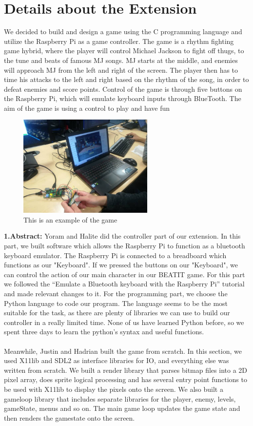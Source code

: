 \documentclass[a4paper]{article}
\begin{document}
\section{Details about the Extension}
We decided to build and design a game using the C programming language and utilize the Raspberry Pi as a game controller. The game is a rhythm fighting game hybrid, where the player will control Michael Jackson to fight off thugs, to the tune and beats of famous MJ songs. MJ starts at the middle, and enemies will approach MJ from the left and right of the screen. The player then has to time his attacks to the left and right based on the rhythm of the song, in order to defeat enemies and score points. Control of the game is through five buttons on the Raspberry Pi, which will emulate keyboard inputs through BlueTooth. The aim of the game is using a control to play and have fun
\begin{figure}[h]
\centering
\includegraphics[width=0.6\textwidth]{game.jpg}
\caption{\label{fig:pi}This is an example of the game}
\end{figure}


\textbf{1.Abstract:}  Yoram and Halite did the controller part of our extension. In this part, we built software which allows the Raspberry Pi to function as a bluetooth keyboard emulator. The Raspberry Pi is connected to a breadboard which functions as our "Keyboard". If we pressed the buttons on our "Keyboard", we can control the action of our main character in our BEATIT game. For this part we followed the “Emulate a Bluetooth keyboard with the Raspberry Pi” tutorial and made relevant changes to it.
For the programming part, we choose the Python language to code our program. The language seems to be the most suitable for the task, as there are plenty of libraries we can use to build our controller in a really limited time. None of us have learned Python before, so we spent three days to learn the python’s syntax and useful functions.\\\\
Meanwhile, Justin and Hadrian built the game from scratch. In this section, we used X11lib and SDL2 as interface libraries for IO, and everything else was written from scratch. We built a render library that parses bitmap files into a 2D pixel array, does sprite logical processing and has several entry point functions to be used with X11lib to display the pixels onto the screen. We also built a gameloop library that includes separate libraries for the player, enemy, levels, gameState, menus and so on. The main game loop updates the game state and then renders the gamestate onto the screen.\\\\
\end{document}
